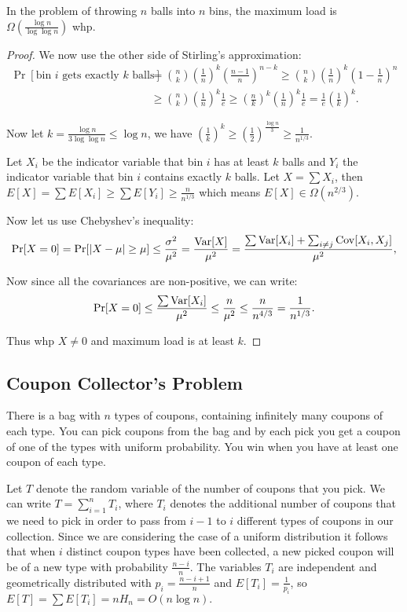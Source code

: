 \begin{proposition} In the problem of throwing $n$ balls into $n$ bins, the maximum load is $\Omega\left( \frac{\log n}{\log \log n} \right)$ whp.
\end{proposition}
\begin{proof}
We now use the other side of Stirling's approximation:
\begin{align*}
\Pr[\text{bin } i \text{ gets exactly } k \text{ balls}] &= \binom{n}{k} \left( \frac{1}{n}\right)^k \left( \frac{n-1}{n}\right)^{n-k} \geq \binom{n}{k} \left( \frac{1}{n} \right)^k \left( 1 - \frac{1}{n}\right)^n \\
  &\geq \binom{n}{k} \left(\frac{1}{n}\right)^k \frac{1}{e} 
\geq \left(\frac{n}{k} \right)^k \left( \frac{1}{n} \right)^k \frac{1}{e} = \frac{1}{e} \left(  \frac{1}{k}\right)^k.
\end{align*}

Now let $k = \frac{\log n}{3 \log \log n} \leq \log n$, we have $\left( \frac{1}{k} \right)^k \geq \left(\frac{1}{2}\right)^{\frac{\log n}{3}} \geq \frac{1}{n^{1/3}}.$

Let $X_i$ be the indicator variable that bin $i$ has at least $k$ balls and $Y_i$ the indicator variable that bin $i$ contains exactly $k$ balls. Let $X = \sum X_i$, then $E[X] = \sum E[X_i] \geq \sum E[Y_i] \geq \frac{n}{n^{1/3}}$ which means $E[X] \in \Omega(n^{2/3}).$

Now let us use Chebyshev's inequality:
$$\Pr[X = 0] = \Pr[\vert X - \mu \vert \geq \mu] \leq \frac{\sigma^2}{\mu^2} = \frac{\mathrm{Var}[X]}{\mu^2} = \frac{\sum \mathrm{Var}[X_i] + \sum_{i \neq j} \mathrm{Cov}[X_i, X_j]}{\mu^2},$$

Now since all the covariances are non-positive, we can write:
$$\Pr[X = 0] \leq \frac{\sum \mathrm{Var}[X_i]}{\mu^2} \leq \frac{n}{\mu^2} \leq \frac{n}{n^{4/3}} = \frac{1}{n^{1/3}}.$$

Thus whp $X \neq 0$ and maximum load is at least $k$.
\end{proof}

\subsection{Coupon Collector's Problem}
There is a bag with $n$ types of coupons, containing infinitely many coupons of each type. You can pick coupons from the bag and by each pick you get a coupon of one of the types with uniform probability. You win when you have at least one coupon of each type.

Let $T$ denote the random variable of the number of coupons that you pick. We can write $T = \sum_{i=1}^{n} T_i$, where $T_i$ denotes the additional number of coupons that we need to pick in order to pass from $i-1$ to $i$ different types of coupons in our collection. Since we are considering the case of a uniform distribution it follows that when $i$ distinct coupon types have been collected, a new picked coupon will be of a new type with probability $\frac{n-i}{n}$. The variables $T_i$ are independent and geometrically distributed with $p_i = \frac{n-i+1}{n}$ and $E[T_i] = \frac{1}{p_i}$, so $E[T] = \sum E[T_i] = n H_n = O(n \log n).$ 

